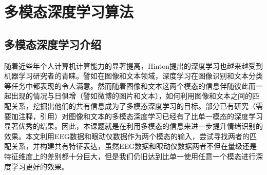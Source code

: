 
\chapter{多模态深度学习算法}
\label{chap:chap6}

\section{多模态深度学习介绍}
	随着近些年个人计算机计算能力的显著提高，Hinton提出的深度学习也越来越受到机器学习研究者的青睐。譬如在图像和文本领域，深度学习在图像识别和文本分类等任务中都表现的令人满意。然而随着图像和文本这两个模态的信息伴随彼此而一起出现的情况与日俱增（譬如微博的图片和文本），如何利用图像和文本之间的匹配关系，挖掘出他们的共有信息成为了多模态深度学习的目标。部分已有研究（需要加注释，引用）对图像和文本的多模态深度学习已经有了比单一模态的深度学习显著优秀的结果。因此，本课题就是在利用多模态的信息来进一步提升情绪识别的效果。本文利用EEG数据和眼动仪数据作为两个模态的输入，尝试寻找两者的匹配关系，并构建共有特征表达，虽然EEG数据和眼动仪数据两者不但在量级还是特征维度上的差别都十分巨大，但是我们仍旧达到比单一使用任意一个模态进行深度学习更好的效果。
	
